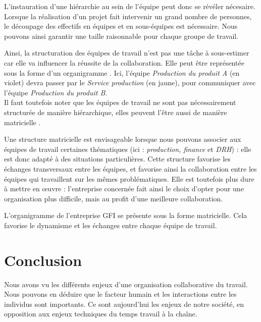L'instauration d'une hiérarchie au sein de l'équipe peut donc se révéler nécesaire. Lorsque la réalisation d'un projet fait intervenir un grand nombre de personnes, le découpage des effectifs en équipes et en sous-équipes est nécessaire. Nous pouvons ainsi garantir une taille raisonnable pour chaque groupe de travail.

Ainsi, la structuration des équipes de travail n'est pas une tâche à sous-estimer car elle va influencer la réussite de la collaboration. Elle peut être représentée sous la forme d'un organigramme . Ici, l'équipe \textit{Production du produit A} (en violet) devra passer par le \textit{Service production} (en jaune), pour communiquer avec l'équipe \textit{Production du produit B}.\\

Il faut toutefois noter que les équipes de travail ne sont pas nécessairement structurée de manière hiérarchique, elles peuvent l'être aussi de manière matricielle .


Une structure matricielle est envisageable lorsque nous pouvons associer aux équipes de travail certaines thématiques (ici : \textit{production, finance} et \textit{DRH}) : elle est donc adapté à des situations particulières. Cette structure favorise les échanges transversaux entre les équipes, et favorise ainsi la collaboration entre les équipes qui travaillent sur les mêmes problématiques. Elle est toutefois plus dure à mettre en œuvre : l'entreprise concernée fait ainsi le choix d'opter pour une organisation plus difficile, mais au profit d'une meilleure collaboration.


\begin{app}
L'organigramme de l'entreprise GFI se présente sous la forme matricielle. Cela favorise le dynamisme et les échanges entre chaque équipe de travail.
\end{app}

\section{Conclusion}

Nous avons vu les différents enjeux d'une organisation collaborative du travail. Nous pouvons en déduire que le facteur humain et les interactions entre les individus sont importants. Ce sont aujourd'hui les enjeux de notre société, en opposition aux enjeux techniques du temps travail à la chaîne.
